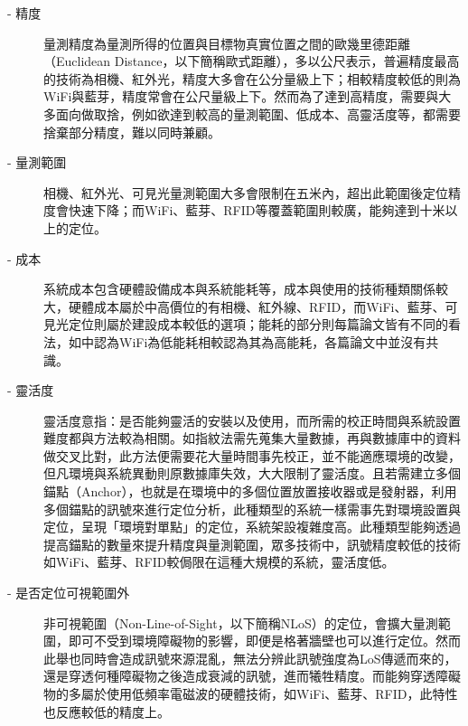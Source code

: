\begin{description}
    \item[- 精度]\hfill 
    
    \qquad
    量測精度為量測所得的位置與目標物真實位置之間的歐幾里德距離（Euclidean Distance，以下簡稱歐式距離），多以公尺表示\cite{survey:indoor_wayfinding}，普遍精度最高的技術為相機、紅外光\cite{survey_indoor2014}，精度大多會在公分量級上下；相較精度較低的則為WiFi與藍芽，精度常會在公尺量級上下\cite{survey_indoor2014}。然而為了達到高精度，需要與大多面向做取捨\cite{survey:indoor_wayfinding}，例如欲達到較高的量測範圍、低成本、高靈活度等，都需要捨棄部分精度，難以同時兼顧。
    
    \item[- 量測範圍] \hfill  
    
    \qquad
    相機、紅外光、可見光量測範圍大多會限制在五米內，超出此範圍後定位精度會快速下降；而WiFi、藍芽、RFID等覆蓋範圍則較廣，能夠達到十米以上的定位\cite{survey_indoor2014}。
    
    \item[- 成本] \hfill 
    
    \qquad
    系統成本包含硬體設備成本與系統能耗等，成本與使用的技術種類關係較大，硬體成本屬於中高價位的有相機、紅外線、RFID，而WiFi、藍芽、可見光定位則屬於建設成本較低的選項；能耗的部分則每篇論文皆有不同的看法，如\cite{survey:radio}中認為WiFi為低能耗相較\cite{survey:indoor_wayfinding}認為其為高能耗，各篇論文中並沒有共識。
    
    \item[- 靈活度] \hfill 
    
    \qquad
    靈活度意指：是否能夠靈活的安裝以及使用，而所需的校正時間與系統設置難度都與方法較為相關。如指紋法需先蒐集大量數據，再與數據庫中的資料做交叉比對，此方法便需要花大量時間事先校正，並不能適應環境的改變，但凡環境與系統異動則原數據庫失效，大大限制了靈活度。且若需建立多個錨點（Anchor），也就是在環境中的多個位置放置接收器或是發射器，利用多個錨點的訊號來進行定位分析，此種類型的系統一樣需事先對環境設置與定位，呈現「環境對單點」的定位，系統架設複雜度高。此種類型能夠透過提高錨點的數量來提升精度與量測範圍，眾多技術中，訊號精度較低的技術如WiFi、藍芽、RFID較侷限在這種大規模的系統，靈活度低。


    
    \item[- 是否定位可視範圍外] \hfill 
    
    \qquad
    非可視範圍（Non-Line-of-Sight，以下簡稱NLoS）的定位，會擴大量測範圍，即可不受到環境障礙物的影響，即便是格著牆壁也可以進行定位。然而此舉也同時會造成訊號來源混亂，無法分辨此訊號強度為LoS傳遞而來的，還是穿透何種障礙物之後造成衰減的訊號，進而犧牲精度。而能夠穿透障礙物的多屬於使用低頻率電磁波的硬體技術，如WiFi、藍芽、RFID，此特性也反應較低的精度上。



\end{description}
